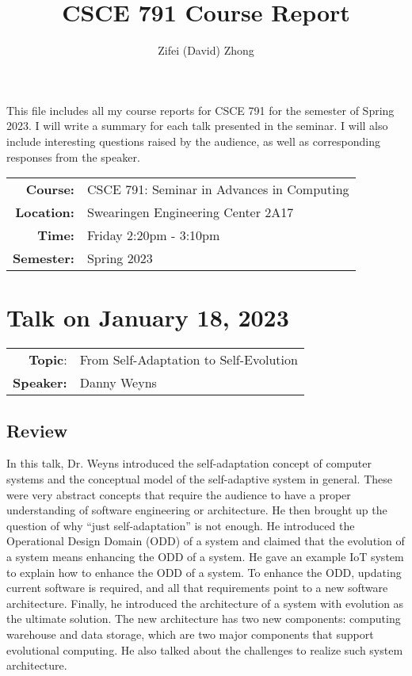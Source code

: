 \documentclass[11pt, oneside]{article}   	%
\title{CSCE 791 Course Report}
\author{Zifei (David) Zhong}
\begin{document}
\maketitle

This file includes all my course reports for CSCE 791 for the semester
of Spring 2023. I will write a summary for each talk presented in the
seminar. I will also include interesting questions raised by the
audience, as well as corresponding responses from the speaker.\\

\begin{center}
\begin{tabularx}{0.65\textwidth}{r X}
\textbf{Course:} & CSCE 791: Seminar in Advances in Computing\\
\textbf{Location:} & Swearingen Engineering Center 2A17\\
\textbf{Time:} & Friday 2:20pm - 3:10pm\\
\textbf{Semester:} & Spring 2023
\end{tabularx}
\end{center}

\newpage
\section{Talk on January 18, 2023}
\begin{tabularx} {\textwidth}{r X}
\textbf{Topic}: & From Self-Adaptation to Self-Evolution \\
\textbf{Speaker:} & Danny Weyns \\
\end{tabularx}

\subsection{Review}
In this talk, Dr. Weyns introduced the self-adaptation concept of computer systems and the conceptual model of the self-adaptive system in general. These were very abstract concepts that require the audience to have a proper understanding of software engineering or architecture. He then brought up the question of why ``just self-adaptation'' is not enough. He introduced the Operational Design Domain (ODD) of a system and claimed that the evolution of a system means enhancing the ODD of a system. He gave an example IoT system to explain how to enhance the ODD of a system. To enhance the ODD, updating current software is required, and all that requirements point to a new software architecture. Finally, he introduced the architecture of a system with evolution as the ultimate solution. The new architecture has two new components: computing warehouse and data storage, which are two major components that support evolutional computing. He also talked about the challenges to realize such system architecture.
\end{document}
